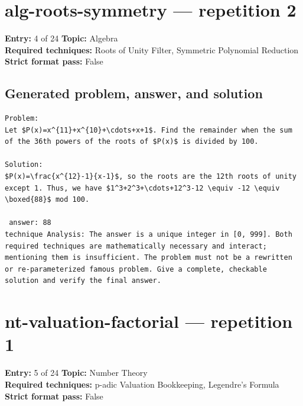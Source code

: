 \documentclass[11pt]{article}
\begin{document}
\section{alg-roots-symmetry --- repetition 2}
\begin{minipage}{\textwidth}
\color{metadata}\small\raggedright
\textbf{Entry:} 4 of 24\quad
\textbf{Topic:} Algebra\\[2pt]
\textbf{Required techniques:} Roots of Unity Filter, Symmetric Polynomial Reduction\\[2pt]
\textbf{Strict format pass:} False
\end{minipage}

\subsection*{Generated problem, answer, and solution}
\begin{lstlisting}[style=modeloutput]
Problem:
Let $P(x)=x^{11}+x^{10}+\cdots+x+1$. Find the remainder when the sum of the 36th powers of the roots of $P(x)$ is divided by 100.

Solution:
$P(x)=\frac{x^{12}-1}{x-1}$, so the roots are the 12th roots of unity except 1. Thus, we have $1^3+2^3+\cdots+12^3-12 \equiv -12 \equiv \boxed{88}$ mod 100.

 answer: 88
technique Analysis: The answer is a unique integer in [0, 999]. Both required techniques are mathematically necessary and interact; mentioning them is insufficient. The problem must not be a rewritten or re-parameterized famous problem. Give a complete, checkable solution and verify the final answer.
\end{lstlisting}
\clearpage
\section{nt-valuation-factorial --- repetition 1}
\begin{minipage}{\textwidth}
\color{metadata}\small\raggedright
\textbf{Entry:} 5 of 24\quad
\textbf{Topic:} Number Theory\\[2pt]
\textbf{Required techniques:} p-adic Valuation Bookkeeping, Legendre's Formula\\[2pt]
\textbf{Strict format pass:} False
\end{minipage}
\end{document}
